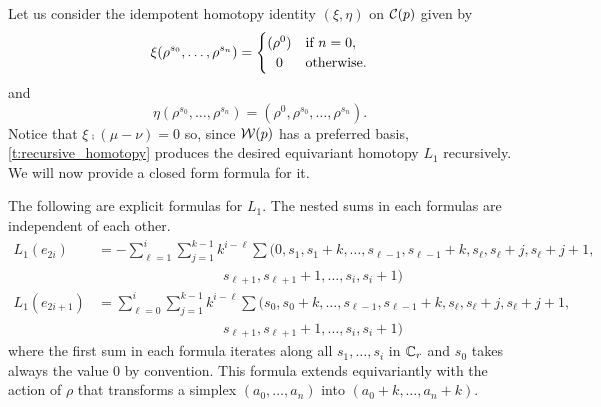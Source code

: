 Let us consider the idempotent homotopy identity $(\xi,\eta)$ on $\mathcal{C}(p)$ given by
\[
\xi(\rho^{s_0},\dots,\rho^{s_n}) =
\begin{cases}
	(\rho^0) & \text{if } n = 0, \\
	\hfil0 & \text{otherwise}.
\end{cases}
\]
and 
\[
\eta(\rho^{s_0},\dots,\rho^{s_n}) = (\rho^0,\rho^{s_0},\dots,\rho^{s_n}).
\]
Notice that $\xi \comp (\mu - \nu) = 0$ so, since $\mathcal{W}(p)$ has a preferred basis, \cref{t:recursive_homotopy} produces the desired equivariant homotopy $L_1$ recursively.
We will now provide a closed form formula for it.

\begin{lemma*} The following are explicit formulas for $L_1$. The nested sums in each formulas are independent of each other.
	\begin{align*}
		L_1(e_{2i}) &= -\sum_{\ell = 1}^i\sum_{j=1}^{k-1} k^{i-\ell}\sum (0,s_1,s_1+k,\ldots,s_{\ell-1},s_{\ell-1}+k,s_{\ell},s_{\ell}+j,s_{\ell}+j+1,\\ & \qquad\qquad\qquad \qquad \quad s_{\ell+1},s_{\ell+1}+1,\ldots,s_i,s_i+1) \\
		L_1(e_{2i+1}) &= \sum_{\ell = 0}^i\sum_{j=1}^{k-1} k^{i-\ell} \sum(s_0,s_0+k,\ldots,s_{\ell-1},s_{\ell-1}+k,s_{\ell},s_{\ell}+j,s_{\ell}+j+1, \\ & \qquad\qquad\qquad \qquad \quad s_{\ell+1},s_{\ell+1}+1,\ldots,s_i,s_i+1)
	\end{align*}
	where the first sum in each formula iterates along all $s_1,\ldots,s_i$ in $\mathbb{C}_r$ and $s_0$ takes always the value $0$ by convention.
    This formula extends equivariantly with the action of $\rho$ that transforms a simplex $(a_0,\ldots,a_n)$ into $(a_0+k,\ldots,a_n+k)$.
\end{lemma*}

